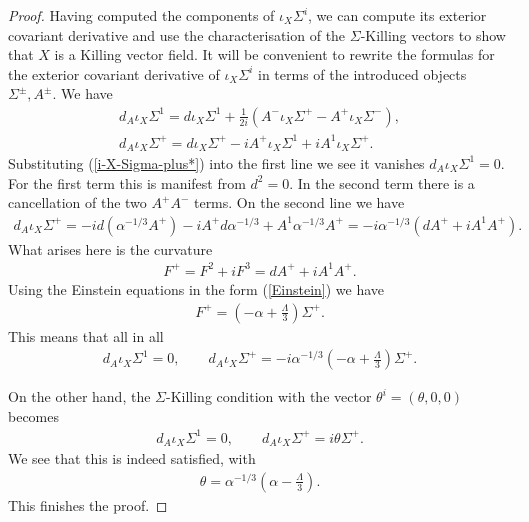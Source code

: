 \documentclass[10pt,a4paper]{amsart}
\begin{document}
\begin{proof}
  Having computed the components of $\iota_X \Sigma^i$, we can compute its exterior covariant derivative and use the characterisation of the $\Sigma$-Killing vectors to show that $X$ is a Killing vector field. It will be convenient to rewrite the formulas for the exterior covariant derivative of $\iota_X \Sigma^i$ in terms of the introduced objects $\Sigma^\pm, A^\pm$. We have
   \begin{align}
  d_A \iota_X \Sigma^1 = d \iota_X \Sigma^1 + \frac{1}{2i} (A^- \iota_X \Sigma^+ - A^+ \iota_X \Sigma^-), \\ \nonumber
  d_A \iota_X\Sigma^+ = d  \iota_X \Sigma^+ - i A^+ \iota_X \Sigma^1 + i A^1 \iota_X \Sigma^+.
    \end{align}
    Substituting (\ref{i-X-Sigma-plus*}) into the first line we see it vanishes $d_A \iota_X \Sigma^1=0$. For the first term this is manifest from $d^2=0$. In the second term there is a cancellation of the two $A^+ A^-$ terms. On the second line we have
    \begin{align}
     d_A \iota_X\Sigma^+ = -i d( \alpha^{-1/3} A^+)  - i A^+ d \alpha^{-1/3} +  A^1 \alpha^{-1/3}A^+ = - i \alpha^{-1/3} (dA^+ +i A^1 A^+).
    \end{align}
What arises here is the curvature 
 \begin{align}
 F^+ = F^2 +i  F^3 = dA^+ +i A^1 A^+.
 \end{align}
 Using the Einstein equations in the form (\ref{Einstein}) we have
 \begin{align}
 F^+ = (-\alpha + \frac{\Lambda}{3}) \Sigma^+.
\end{align}
 This means that all in all
 \begin{align}
 d_A \iota_X\Sigma^1=0, \qquad d_A \iota_X\Sigma^+ = -i \alpha^{-1/3}(-\alpha + \frac{\Lambda}{3}) \Sigma^+.
 \end{align}
    
    On the other hand, the $\Sigma$-Killing condition with the vector $\theta^i=(\theta,0,0)$ becomes
    \begin{align}
    d_A \iota_X \Sigma^1 = 0, \qquad d_A \iota_X\Sigma^+= i \theta \Sigma^+.
     \end{align}
     We see that this is indeed satisfied, with
     \begin{align}
     \theta = \alpha^{-1/3}(\alpha - \frac{\Lambda}{3}).
     \end{align}
     This finishes the proof. 
   \end{proof}
\end{document}
